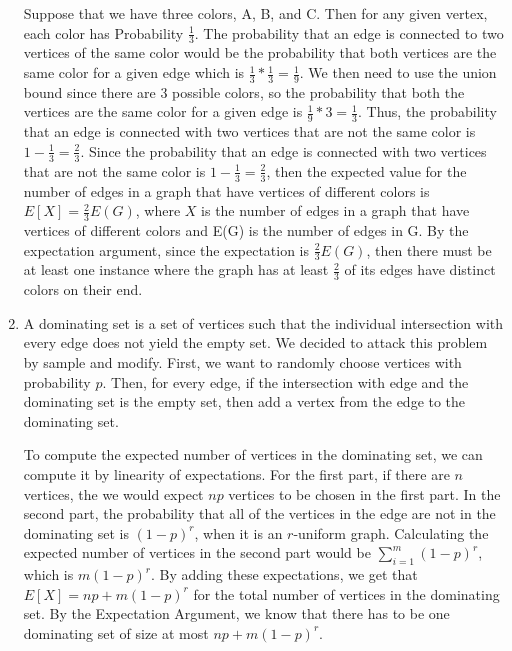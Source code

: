 \documentclass[11pt]{amsart}
\begin{document}
\begin{enumerate}
{Suppose that we have three colors, A, B, and C. \newline
Then for any given vertex, each color has Probability $\frac{1}{3}$. The probability that an edge is connected to two vertices of the same color would be the probability that both vertices are the same color for a given edge which is $\frac{1}{3} * \frac{1}{3} = \frac{1}{9}$. We then need to use the union bound since there are 3 possible colors, so the probability that both the vertices are the same color for a given edge is $\frac{1}{9} * 3 = \frac{1}{3}$. Thus, the probability that an edge is connected with two vertices that are not the same color is $1- \frac{1}{3} = \frac{2}{3}$. Since the probability that an edge is connected with two vertices that are not the same color is $1- \frac{1}{3} = \frac{2}{3}$, then the expected value for the number of edges in a graph that have vertices of different colors is $E[X] = \frac{2}{3}E(G)$, where $X$ is the number of edges in a graph that have vertices of different colors and E(G) is the number of edges in G. By the expectation argument, since the expectation is $\frac{2}{3}E(G)$, then there must be at least one instance where the graph has at least $\frac{2}{3}$ of its edges have distinct colors on their end.



}

\item {}

{
A dominating set is a set of vertices such that the individual intersection with every edge does not yield the empty set. We decided to attack this problem by sample and modify. \newline
First, we want to randomly choose vertices with probability $p$. \newline
Then, for every edge, if the intersection with edge and the dominating set is the empty set, then add a vertex from the edge to the dominating set. \newline

To compute the expected number of vertices in the dominating set, we can compute it by linearity of expectations. For the first part, if there are $n$ vertices, the we would expect $np$ vertices to be chosen in the first part. In the second part, the probability that all of the vertices in the edge are not in the dominating set is $(1-p)^r$, when it is an $r$-uniform graph. Calculating the expected number of vertices in the second part would be $\sum_{i=1}^{m} (1-p)^r$, which is $m(1-p)^r$. By adding these expectations, we get that $E[X] = np + m(1-p)^r$ for the total number of vertices in the dominating set. By the Expectation Argument, we know that there has to be one dominating set of size at most $np + m(1-p)^r$. 

}
\end{enumerate}
\end{document}
